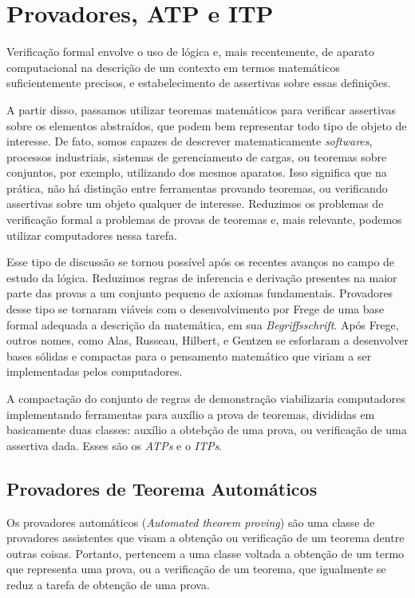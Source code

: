 \section{Provadores, ATP e ITP}

Verificação formal envolve o uso de lógica e, mais recentemente, de aparato computacional na descrição de um contexto em termos matemáticos suficientemente precisos, e estabelecimento de assertivas sobre essas definições.

A partir disso, passamos utilizar teoremas matemáticos para verificar assertivas sobre os elementos abstraídos, que podem bem representar todo tipo de objeto de interesse.
De fato, somos capazes de descrever matematicamente \textit{softwares}, processos industriais, sistemas de gerenciamento de cargas, ou teoremas sobre conjuntos, por exemplo, utilizando dos mesmos aparatos.
Isso significa que na prática, não há distinção entre ferramentas provando teoremas, ou verificando assertivas sobre um objeto qualquer de interesse.
Reduzimos os problemas de verificação formal a problemas de provas de teoremas e, mais relevante, podemos utilizar computadores nessa tarefa.

Esse tipo de discussão se tornou possível após os recentes avanços no campo de estudo da lógica.
Reduzimos regras de inferencia e derivação presentes na maior parte das provas a um conjunto pequeno de axiomas fundamentais.
Provadores desse tipo se tornaram viáveis com o desenvolvimento por Frege de uma base formal adequada a descrição da matemática, em sua \textit{Begriffsschrift}.
Após Frege, outros nomes, como Alas, Russeau, Hilbert, e Gentzen se esforlaram a desenvolver bases sólidas e compactas para o pensamento matemático que viriam a ser implementadas pelos computadores.

A compactação do conjunto de regras de demonstração viabilizaria computadores implementando ferramentas para auxílio a prova de teoremas, divididas em basicamente duas classes: auxílio a obtebção de uma prova, ou verificação de uma assertiva dada. Esses são os \textit{ATPs} e o \textit{ITPs}.

\subsection{Provadores de Teorema Automáticos}
Os provadores automáticos (\textit{Automated theorem proving}) são uma classe de provadores assistentes que visam a obtenção ou verificação de um teorema dentre outras coisas.
Portanto, pertencem a uma classe voltada a obtenção de um termo que representa uma prova, ou a verificação de um teorema, que igualmente se reduz a tarefa de obtenção de uma prova.

